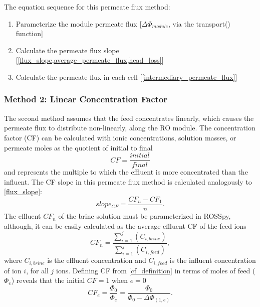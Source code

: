 The equation sequence for this permeate flux method:
\begin{enumerate}
    \item Parameterize the module permeate flux [$\Delta \Phi_{module}$, via the transport() function]
    \item Calculate the permeate flux slope [\cref{flux_slope,average_permeate_flux,head_loss}]
    \item Calculate the permeate flux in each cell [\cref{intermediary_permeate_flux}]
\end{enumerate}


\subsubsection{Method 2: Linear Concentration Factor}
The second method assumes that the feed concentrates linearly, which causes the permeate flux to distribute non-linearly, along the RO module. The concentration factor (CF) \cite{McCaffrey1987TheHalite.,Casas2012SeawaterElectrodialysis,Kartashevsky2015PhosphateEffluents,Yan2017ReverseVelocity} can be calculated with ionic concentrations, solution masses, or permeate moles as the quotient of initial to final  \cite{Casas2012SeawaterElectrodialysis,Yan2017ReverseVelocity}
\begin{equation} \label{cf_definition}
    CF = \frac{initial}{final}
\end{equation}
and represents the multiple to which the effluent is more concentrated than the influent. The CF slope in this permeate flux method is calculated analogously to \cref{flux_slope}:
\begin{equation} \label{average_cf_slope}
    slope_{CF} =\frac{CF_{n}-CF_1}{n}.
\end{equation}
The effluent $CF_{n}$ of the brine solution must be parameterized in ROSSpy, although, it can be easily calculated as the average effluent CF of the feed ions 
\begin{equation} \label{cf_calculation_output}
    CF_{n}=\frac{\sum_{i=1}^j(C_{i,brine})}{\sum_{i=1}^j(C_{i,feed})},
\end{equation}
where $C_{i,brine}$ is the effluent concentration and $C_{i,feed}$ is the influent concentration of ion $i$, for all $j$ ions. Defining CF from \cref{cf_definition} in terms of moles of feed ($\Phi_e$) reveals that the initial $CF=1$ when $e=0$ 
\begin{equation} \label{cf_cell_definition}
    CF_e=\frac{\Phi_0}{\Phi_e}=\frac{\Phi_0}{\Phi_0-\Delta \Phi_{(1,e)}}.
\end{equation}

